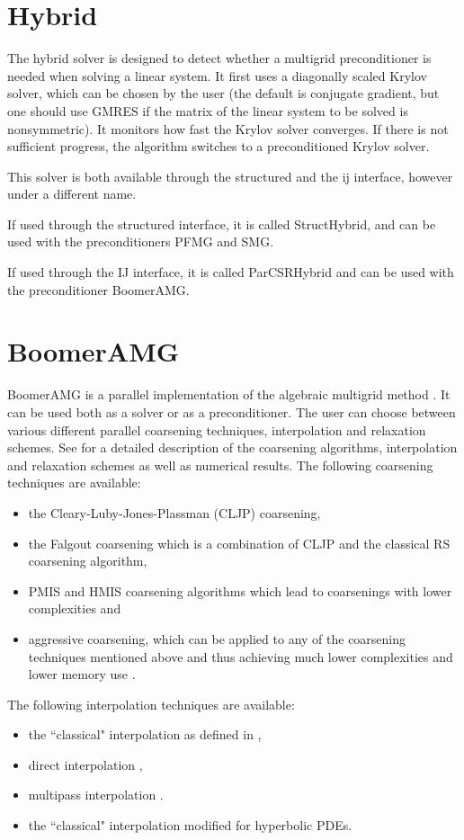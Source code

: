 \section{Hybrid}

The hybrid solver is designed to detect whether a multigrid preconditioner
is needed when solving a linear system.
It first uses a diagonally scaled Krylov solver, which can be chosen by the user
(the default is conjugate gradient, but one should use GMRES if the matrix of the 
linear system to be solved is nonsymmetric). It monitors how fast the Krylov solver
converges.
If there is not sufficient progress, the algorithm switches to a preconditioned
Krylov solver.

This solver is both available through the structured and the ij interface,
however under a different name.

If used through the structured interface, it is called StructHybrid, and can be
used with the preconditioners PFMG and SMG.

If used through the IJ interface, it is called ParCSRHybrid and can be used with 
the preconditioner BoomerAMG.



\section{BoomerAMG}

BoomerAMG is a parallel implementation of the algebraic multigrid 
method \cite{Ruge_Stueben_1987}. 
It can be used
both as a solver or as a preconditioner.  The user can choose between various
different parallel coarsening techniques, interpolation and relaxation schemes.
See
\cite{VEHenson_UMYang_2002,UMYang_2005} for a detailed description of the 
coarsening
algorithms, interpolation and relaxation schemes as well as numerical results.  The following
coarsening techniques are available:
\begin{itemize}
\item the Cleary-Luby-Jones-Plassman (CLJP) coarsening,
\item the Falgout coarsening which is a combination of CLJP and the
classical RS coarsening algorithm,
\item PMIS and HMIS coarsening algorithms which lead to coarsenings with lower complexities \cite{DeSterck_Yang_Heys_2004}
and 
\item aggressive coarsening, which can be applied to any of the coarsening techniques mentioned above and thus achieving much lower complexities and lower memory use \cite{Stueben_1999}.
\end{itemize}
The following interpolation techniques are available:
\begin{itemize}
\item the ``classical" interpolation as defined in \cite{Ruge_Stueben_1987},
\item direct interpolation \cite{Stueben_1999},
\item multipass interpolation \cite{Stueben_1999}.
\item the ``classical" interpolation modified for hyperbolic PDEs.
\end{itemize}

